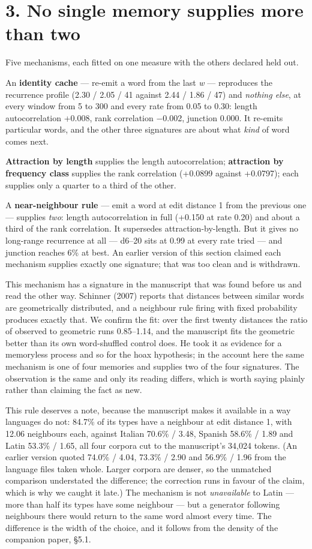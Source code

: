 \documentclass[11pt,a4paper]{article}
\begin{document}
\section*{3. No single memory supplies more than two}


Five mechanisms, each fitted on one measure with the others declared held out.


An \textbf{identity cache} --- re-emit a word from the last \emph{w} --- reproduces the recurrence profile (2.30 / 2.05 / 41 against 2.44 / 1.86 / 47) and \emph{nothing else}, at every window from 5 to 300 and every rate from 0.05 to 0.30: length autocorrelation +0.008, rank correlation $-$0.002, junction 0.000. It re-emits particular words, and the other three signatures are about what \emph{kind} of word comes next.


\textbf{Attraction by length} supplies the length autocorrelation; \textbf{attraction by frequency class} supplies the rank correlation (+0.0899 against +0.0797); each supplies only a quarter to a third of the other.


A \textbf{near-neighbour rule} --- emit a word at edit distance 1 from the previous one --- supplies \emph{two}: length autocorrelation in full (+0.150 at rate 0.20) and about a third of the rank correlation. It supersedes attraction-by-length. But it gives no long-range recurrence at all --- d6--20 sits at 0.99 at every rate tried --- and junction reaches 6\% at best. An earlier version of this section claimed each mechanism supplies exactly one signature; that was too clean and is withdrawn.


This mechanism has a signature in the manuscript that was found before us and read the other way. Schinner (2007) reports that distances between similar words are geometrically distributed, and a neighbour rule firing with fixed probability produces exactly that. We confirm the fit: over the first twenty distances the ratio of observed to geometric runs 0.85--1.14, and the manuscript fits the geometric better than its own word-shuffled control does. He took it as evidence for a memoryless process and so for the hoax hypothesis; in the account here the same mechanism is one of four memories and supplies two of the four signatures. The observation is the same and only its reading differs, which is worth saying plainly rather than claiming the fact as new.


This rule deserves a note, because the manuscript makes it available in a way languages do not: 84.7\% of its types have a neighbour at edit distance 1, with 12.06 neighbours each, against Italian 70.6\% / 3.48, Spanish 58.6\% / 1.89 and Latin 53.3\% / 1.65, all four corpora cut to the manuscript's 34,024 tokens. (An earlier version quoted 74.0\% / 4.04, 73.3\% / 2.90 and 56.9\% / 1.96 from the language files taken whole. Larger corpora are denser, so the unmatched comparison understated the difference; the correction runs in favour of the claim, which is why we caught it late.) The mechanism is not \emph{unavailable} to Latin --- more than half its types have some neighbour --- but a generator following neighbours there would return to the same word almost every time. The difference is the width of the choice, and it follows from the density of the companion paper, \S5.1.
\end{document}
